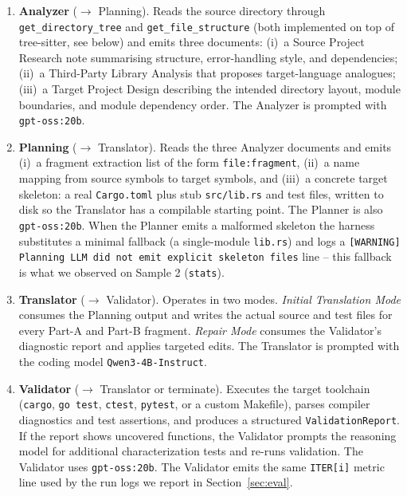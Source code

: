 \begin{enumerate}
\item \textbf{Analyzer} ($\rightarrow$ Planning). Reads the source
directory through \texttt{get\_directory\_tree} and
\texttt{get\_file\_structure} (both implemented on top of tree-sitter,
see below) and emits three documents: (i)~a Source Project Research
note summarising structure, error-handling style, and dependencies;
(ii)~a Third-Party Library Analysis that proposes target-language
analogues; (iii)~a Target Project Design describing the intended
directory layout, module boundaries, and module dependency order. The
Analyzer is prompted with \texttt{gpt-oss:20b}.

\item \textbf{Planning} ($\rightarrow$ Translator). Reads the three
Analyzer documents and emits (i)~a fragment extraction list of the form
\texttt{file:fragment}, (ii)~a name mapping from source symbols to target
symbols, and (iii)~a concrete target skeleton: a real \texttt{Cargo.toml}
plus stub \texttt{src/lib.rs} and test files, written to disk so the
Translator has a compilable starting point. The Planner is also
\texttt{gpt-oss:20b}. When the Planner emits a malformed skeleton the
harness substitutes a minimal fallback (a single-module
\texttt{lib.rs}) and logs a \texttt{[WARNING] Planning LLM did not emit
explicit skeleton files} line -- this fallback is what we observed on
Sample 2 (\texttt{stats}).

\item \textbf{Translator} ($\rightarrow$ Validator). Operates in two
modes. \emph{Initial Translation Mode} consumes the Planning output
and writes the actual source and test files for every Part-A and Part-B
fragment. \emph{Repair Mode} consumes the Validator's diagnostic
report and applies targeted edits. The Translator is prompted with the
coding model \texttt{Qwen3-4B-Instruct}.

\item \textbf{Validator} ($\rightarrow$ Translator or terminate).
Executes the target toolchain (\texttt{cargo}, \texttt{go test},
\texttt{ctest}, \texttt{pytest}, or a custom Makefile), parses compiler
diagnostics and test assertions, and produces a structured
\texttt{ValidationReport}. If the report shows uncovered functions,
the Validator prompts the reasoning model for additional
characterization tests and re-runs validation. The Validator uses
\texttt{gpt-oss:20b}. The Validator emits the same \texttt{ITER[i]}
metric line used by the run logs we report in Section~\ref{sec:eval}.
\end{enumerate}

